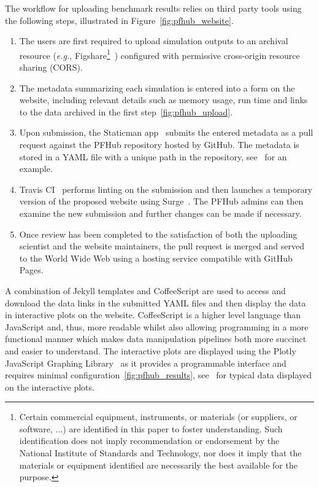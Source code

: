 \documentclass{jors}
\begin{document}
The workflow for uploading benchmark results relies on third party
tools using the following steps, illustrated in
Figure~\ref{fig:pfhub_website}.
\begin{enumerate}
  \item The users are first required to upload simulation outputs to
    an archival resource (\emph{e.g.}, Figshare\footnote{Certain
      commercial equipment, instruments, or materials (or suppliers,
      or software, ...) are identified in this paper to foster
      understanding. Such identification does not imply recommendation
      or endorsement by the National Institute of Standards and
      Technology, nor does it imply that the materials or equipment
      identified are necessarily the best available for the
      purpose.\label{disclaimer}}~\cite{figshare}) configured with
    permissive cross-origin resource sharing (CORS).
  \item The metadata summarizing each simulation is entered into a
    form on the website, including relevant details such as memory
    usage, run time and links to the data archived in the first
    step~\ref{fig:pfhub_upload}.
  \item Upon submission, the Staticman app~\cite{staticman} submits
    the entered metadata as a pull request against the PFHub
    repository hosted by GitHub. The metadata is stored in a YAML file
    with a unique path in the repository, see~\cite{upload_data} for
    an example.
  \item Travis CI~\cite{travis} performs linting on the submission and
    then launches a temporary version of the proposed website using
    Surge~\cite{surge}. The PFHub admins can then examine the new
    submission and further changes can be made if necessary.
  \item Once review has been completed to the satisfaction of both the
    uploading scientist and the website maintainers, the pull request
    is merged and served to the World Wide Web using a hosting service
    compatible with GitHub Pages.
\end{enumerate}
A combination of Jekyll templates and CoffeeScript are used to access
and download the data links in the submitted YAML files and then
display the data in interactive plots on the website. CoffeeScript is
a higher level language than JavaScript and, thus, more readable
whilst also allowing programming in a more functional manner which
makes data manipulation pipelines both more succinct and easier to
understand. The interactive plots are displayed using the Plotly
JavaScript Graphing Library~\cite{plotly} as it provides a
programmable interface and requires minimal
configuration~\ref{fig:pfhub_results}, see~\cite{display_data} for
typical data displayed on the interactive plots.
\end{document}
